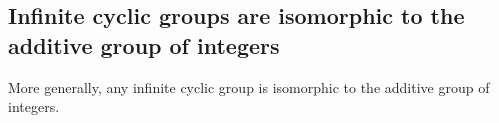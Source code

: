 
\subsection{Infinite cyclic groups are isomorphic to the additive group of integers}

More generally, any infinite cyclic group is isomorphic to the additive group of integers.


